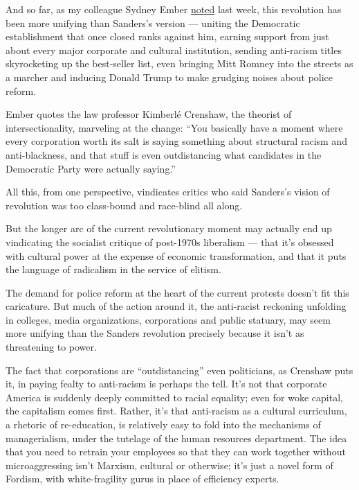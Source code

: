 And so far, as my colleague Sydney Ember
\href{https://www.nytimes3xbfgragh.onion/2020/06/19/us/politics/bernie-sanders-protests.html}{noted}
last week, this revolution has been more unifying than Sanders's version
--- uniting the Democratic establishment that once closed ranks against
him, earning support from just about every major corporate and cultural
institution, sending anti-racism titles skyrocketing up the best-seller
list, even bringing Mitt Romney into the streets as a marcher and
inducing Donald Trump to make grudging noises about police reform.

Ember quotes the law professor Kimberlé Crenshaw, the theorist of
intersectionality, marveling at the change: ``You basically have a
moment where every corporation worth its salt is saying something about
structural racism and anti-blackness, and that stuff is even
outdistancing what candidates in the Democratic Party were actually
saying.''

All this, from one perspective, vindicates critics who said Sanders's
vision of revolution was too class-bound and race-blind all along.

But the longer arc of the current revolutionary moment may actually end
up vindicating the socialist critique of post-1970s liberalism --- that
it's obsessed with cultural power at the expense of economic
transformation, and that it puts the language of radicalism in the
service of elitism.

The demand for police reform at the heart of the current protests
doesn't fit this caricature. But much of the action around it, the
anti-racist reckoning unfolding in colleges, media organizations,
corporations and public statuary, may seem more unifying than the
Sanders revolution precisely because it isn't as threatening to power.

The fact that corporations are ``outdistancing'' even politicians, as
Crenshaw puts it, in paying fealty to anti-racism is perhaps the tell.
It's not that corporate America is suddenly deeply committed to racial
equality; even for woke capital, the capitalism comes first. Rather,
it's that anti-racism as a cultural curriculum, a rhetoric of
re-education, is relatively easy to fold into the mechanisms of
managerialism, under the tutelage of the human resources department. The
idea that you need to retrain your employees so that they can work
together without microaggressing isn't Marxism, cultural or otherwise;
it's just a novel form of Fordism, with white-fragility gurus in place
of efficiency experts.

